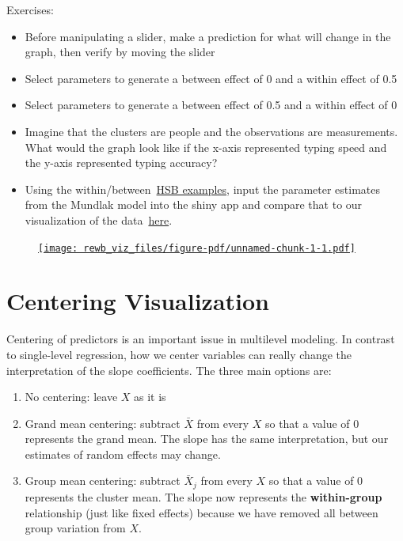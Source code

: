 \documentclass[
  letterpaper,
  DIV=11,
  numbers=noendperiod]{scrreprt}
\providecommand{\tightlist}{%
  \setlength{\itemsep}{0pt}\setlength{\parskip}{0pt}}\usepackage{longtable,booktabs,array}
\begin{document}
Exercises:

\begin{itemize}
\item
  Before manipulating a slider, make a prediction for what will change
  in the graph, then verify by moving the slider
\item
  Select parameters to generate a between effect of 0 and a within
  effect of 0.5
\item
  Select parameters to generate a between effect of 0.5 and a within
  effect of 0
\item
  Imagine that the clusters are people and the observations are
  measurements. What would the graph look like if the x-axis represented
  typing speed and the y-axis represented typing accuracy?
\item
  Using the
  within/between~\href{https://lmiratrix.github.io/MLM/within_v_between.html}{HSB
  examples}, input the parameter estimates from the Mundlak model into
  the shiny app and compare that to our visualization of the
  data~\href{https://lmiratrix.github.io/MLM/double_plot.html}{here}.
\end{itemize}

\begin{figure}

{\centering 

\href{https://s43dnt-josh-gilbert.shinyapps.io/s43_rewb_viz/}{\texttt{[image: rewb\_viz\_files/figure-pdf/unnamed-chunk-1-1.pdf]}}

}

\end{figure}

\hypertarget{centering-visualization}{%
\chapter{Centering Visualization}\label{centering-visualization}}

Centering of predictors is an important issue in multilevel modeling. In
contrast to single-level regression, how we center variables can really
change the interpretation of the slope coefficients. The three main
options are:

\begin{enumerate}
\def\labelenumi{\arabic{enumi}.}
\tightlist
\item
  No centering: leave \(X\) as it is
\item
  Grand mean centering: subtract \(\bar{X}\) from every \(X\) so that a
  value of 0 represents the grand mean. The slope has the same
  interpretation, but our estimates of random effects may change.
\item
  Group mean centering: subtract \(\bar{X}_j\) from every \(X\) so that
  a value of 0 represents the cluster mean. The slope now represents the
  \textbf{within-group} relationship (just like fixed effects) because
  we have removed all between group variation from \(X\).
\end{enumerate}
\end{document}
